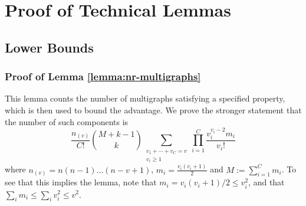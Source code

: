\documentclass[11pt, letterpaper]{article}
\numberwithin{equation}{section}
\begin{document}
\newpage




\newpage
\appendix
\section{Proof of Technical Lemmas}
 \subsection{Lower Bounds}
\subsubsection{Proof of Lemma \ref{lemma:nr-multigraphs}}\label{app:pf-counting-lemma}
This lemma counts the number of multigraphs satisfying a specified property, which is then used to bound the advantage. We prove the stronger statement that the number of such components is \[\frac{ n_{(v)}}{C!}  \binom{M+k-1}{k}
\sum_{\substack{v_1+\cdots+v_C=v \\ v_i \ge 1}}
\prod_{i=1}^C
\frac{v_i^{v_i-2}m_i}{v_i!}\]
   where $n_{(v)}=n(n-1)\ldots(n-v+1)$, $m_i=\frac{v_i(v_i+1)}{2}$ and $M:=\sum_{i=1}^C m_i$. To see that this implies the lemma, note that $m_i=v_i(v_i+1)/2 \leq v_i^2$, and that $\sum_i m_i \leq \sum_i v_i^2\leq v^2$.
\end{document}
